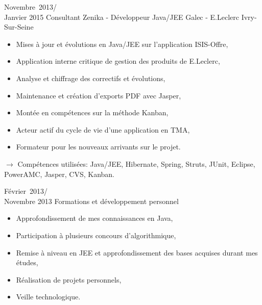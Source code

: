 \documentclass[11pt,a4paper]{moderncv}
\begin{document}
\cventry
{Novembre\ 2013/\\Janvier 2015}
{Consultant Zenika - Développeur Java/JEE}
{Galec - E.Leclerc}
{Ivry-Sur-Seine}
{}
{\begin{itemize}
\item Mises à jour et évolutions en Java/JEE sur l'application ISIS-Offre,
\item Application interne critique de gestion des produits de E.Leclerc,
\item Analyse et chiffrage des correctifs et évolutions,
\item Maintenance et création d'exports PDF avec Jasper,
\item Montée en compétences sur la méthode Kanban,
\item Acteur actif du cycle de vie d'une application en TMA,
\item Formateur pour les nouveaux arrivants sur le projet.
\end{itemize}
$\rightarrow$ Compétences utilisées: Java/JEE, Hibernate, Spring, Struts, JUnit, Eclipse, PowerAMC, Jasper, CVS, Kanban.
}   %

\cventry
{Février\ 2013/\\Novembre 2013}
{Formations et développement personnel}{}{}{}
{\begin{itemize}
\item Approfondissement de mes connaissances en Java,
\item Participation à plusieurs concours d'algorithmique,
\item Remise à niveau en JEE et approfondissement des bases acquises durant mes études,
\item Réalisation de projets personnels,
\item Veille technologique.
\end{itemize}
}   %
\end{document}
